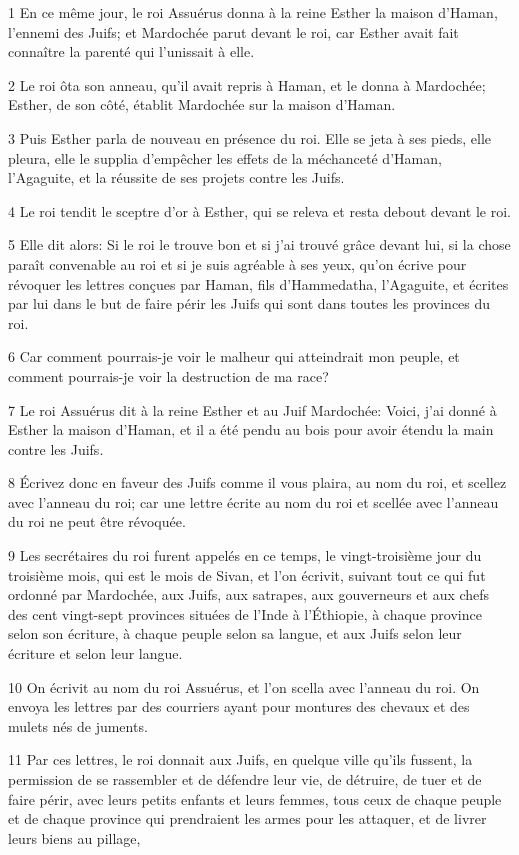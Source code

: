 \par 1 En ce même jour, le roi Assuérus donna à la reine Esther la maison d'Haman, l'ennemi des Juifs; et Mardochée parut devant le roi, car Esther avait fait connaître la parenté qui l'unissait à elle.
\par 2 Le roi ôta son anneau, qu'il avait repris à Haman, et le donna à Mardochée; Esther, de son côté, établit Mardochée sur la maison d'Haman.
\par 3 Puis Esther parla de nouveau en présence du roi. Elle se jeta à ses pieds, elle pleura, elle le supplia d'empêcher les effets de la méchanceté d'Haman, l'Agaguite, et la réussite de ses projets contre les Juifs.
\par 4 Le roi tendit le sceptre d'or à Esther, qui se releva et resta debout devant le roi.
\par 5 Elle dit alors: Si le roi le trouve bon et si j'ai trouvé grâce devant lui, si la chose paraît convenable au roi et si je suis agréable à ses yeux, qu'on écrive pour révoquer les lettres conçues par Haman, fils d'Hammedatha, l'Agaguite, et écrites par lui dans le but de faire périr les Juifs qui sont dans toutes les provinces du roi.
\par 6 Car comment pourrais-je voir le malheur qui atteindrait mon peuple, et comment pourrais-je voir la destruction de ma race?
\par 7 Le roi Assuérus dit à la reine Esther et au Juif Mardochée: Voici, j'ai donné à Esther la maison d'Haman, et il a été pendu au bois pour avoir étendu la main contre les Juifs.
\par 8 Écrivez donc en faveur des Juifs comme il vous plaira, au nom du roi, et scellez avec l'anneau du roi; car une lettre écrite au nom du roi et scellée avec l'anneau du roi ne peut être révoquée.
\par 9 Les secrétaires du roi furent appelés en ce temps, le vingt-troisième jour du troisième mois, qui est le mois de Sivan, et l'on écrivit, suivant tout ce qui fut ordonné par Mardochée, aux Juifs, aux satrapes, aux gouverneurs et aux chefs des cent vingt-sept provinces situées de l'Inde à l'Éthiopie, à chaque province selon son écriture, à chaque peuple selon sa langue, et aux Juifs selon leur écriture et selon leur langue.
\par 10 On écrivit au nom du roi Assuérus, et l'on scella avec l'anneau du roi. On envoya les lettres par des courriers ayant pour montures des chevaux et des mulets nés de juments.
\par 11 Par ces lettres, le roi donnait aux Juifs, en quelque ville qu'ils fussent, la permission de se rassembler et de défendre leur vie, de détruire, de tuer et de faire périr, avec leurs petits enfants et leurs femmes, tous ceux de chaque peuple et de chaque province qui prendraient les armes pour les attaquer, et de livrer leurs biens au pillage,
